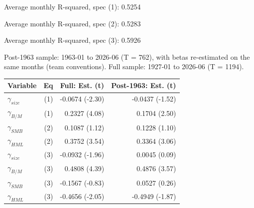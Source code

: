 \documentclass[11pt,letterpaper]{article}
\begin{document}
\begin{center}
\small
{}
\end{center}

Average monthly R-squared, spec (1): 0.5254

Average monthly R-squared, spec (2): 0.5283

Average monthly R-squared, spec (3): 0.5926

Post-1963 sample: 1963-01 to 2026-06 (T = 762), with betas re-estimated on the same months (team conventions). Full sample: 1927-01 to 2026-06 (T = 1194).

\begin{center}
\small
\begin{tabular}{lrrr}
\toprule
Variable & Eq & Full: Est. (t) & Post-1963: Est. (t) \\
\midrule
\(\gamma_{size}\) & (1) & -0.0674 (-2.30) & -0.0437 (-1.52) \\
\(\gamma_{B/M}\) & (1) & 0.2327 (4.08) & 0.1704 (2.50) \\
\(\gamma_{SMB}\) & (2) & 0.1087 (1.12) & 0.1228 (1.10) \\
\(\gamma_{HML}\) & (2) & 0.3752 (3.54) & 0.3364 (3.06) \\
\(\gamma_{size}\) & (3) & -0.0932 (-1.96) & 0.0045 (0.09) \\
\(\gamma_{B/M}\) & (3) & 0.4808 (4.39) & 0.4876 (3.57) \\
\(\gamma_{SMB}\) & (3) & -0.1567 (-0.83) & 0.0527 (0.26) \\
\(\gamma_{HML}\) & (3) & -0.4656 (-2.05) & -0.4949 (-1.87) \\
\bottomrule
\end{tabular}
\end{center}
\end{document}
